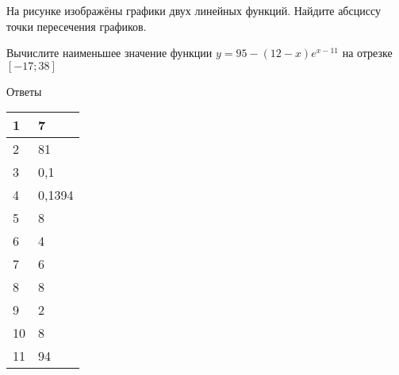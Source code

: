 \documentclass[twocolumn]{article}
\begin{document}
\begin{taskBN}{10}
На рисунке изображёны графики двух линейных функций. Найдите абсциссу точки пересечения графиков.\vspace{2.5cm}
\end{taskBN}

\begin{taskBN}{11}
Вычислите наименьшее значение функции $y =95-(12-x)e^{x-11}$ на отрезке $\left[-17;38 \right]$
\end{taskBN}

\newpage
 Ответы

\begin{table}[h]\begin{tabular}{|l|l|}
\hline
1 & 7
\\
\hline
2 & 81
\\
\hline
3 & 0,1
\\
\hline
4 & 0,1394
\\
\hline
5 & 8
\\
\hline
6 & 4
\\
\hline
7 & 6
\\
\hline
8 & 8
\\
\hline
9 & 2
\\
\hline
10 & 8
\\
\hline
11 & 94
\\
\hline
\end{tabular}\end{table}



\newpage
\end{document}
